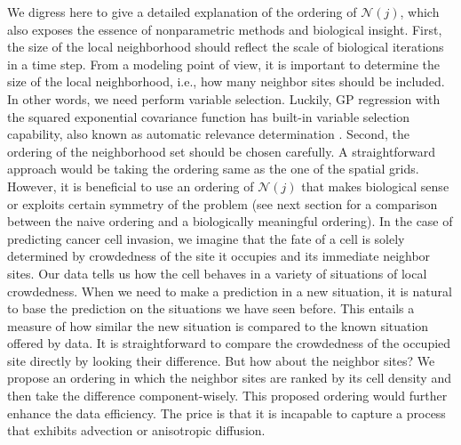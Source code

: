 \documentclass[11pt, reqno]{amsart}
\begin{document}
We digress here to give a detailed explanation of the ordering of $\mathcal{N}(j)$, which also exposes the essence of nonparametric methods and biological insight. First, the size of the local neighborhood should reflect the scale of biological iterations in a time step. From a modeling point of view, it is important to determine the size of the local neighborhood, i.e., how many neighbor sites should be included. In other words, we need perform variable selection. Luckily, GP regression with the squared exponential covariance function has built-in variable selection capability, also known as automatic relevance determination \citep{neal2012bayesian,williams1996gaussian,Rasmussen2006}. Second, the ordering of the neighborhood set should be chosen carefully. A straightforward approach would be taking the ordering same as the one of the spatial grids. However, it is beneficial to use an ordering of $\mathcal{N}(j)$ that makes biological sense or exploits certain symmetry of the problem (see next section for a comparison between the naive ordering and a biologically meaningful ordering). In the case of predicting cancer cell invasion, we imagine that the fate of a cell is solely determined by crowdedness of the site it occupies and its immediate neighbor sites. Our data tells us how the cell behaves in a variety of situations of local crowdedness. When we need to make a prediction in a new situation, it is natural to base the prediction on the situations we have seen before. This entails a measure of how similar the new situation is compared to the known situation offered by data. It is straightforward to compare the crowdedness of the occupied site directly by looking their difference. But how about the neighbor sites? We propose an ordering in which the neighbor sites are ranked by its cell density and then take the difference component-wisely. This proposed ordering would further enhance the data efficiency. The price is that it is incapable to capture a process that exhibits advection or anisotropic diffusion. 
\end{document}
